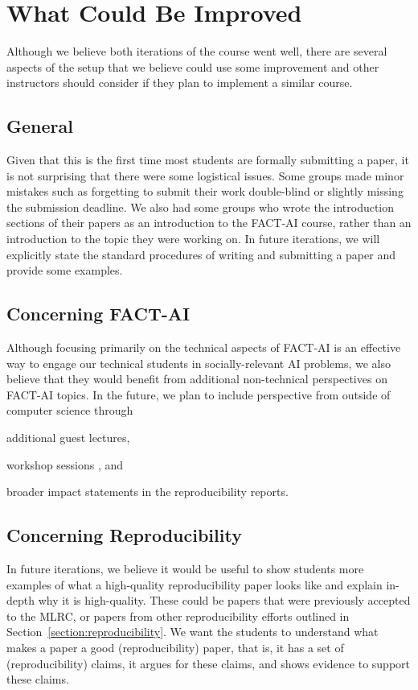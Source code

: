 \documentclass[letterpaper]{article}
\begin{document}
\section{What Could Be Improved}
\label{section:whatdidnt}


Although we believe both iterations of the course went well, there are several aspects of the setup that we believe could use some improvement and other instructors should consider if they plan to implement a similar course.

\subsection{General}

Given that this is the first time most students are formally submitting a paper, it is not surprising that there were some logistical issues.
Some groups made minor mistakes such as forgetting to submit their work double-blind or slightly missing the submission deadline.
We also had some groups who wrote the introduction sections of their papers as an introduction to the FACT-AI course, rather than an introduction to the topic they were working on.
In future iterations, we will explicitly state the standard procedures of writing and submitting a paper and provide some examples.

\subsection{Concerning FACT-AI}
\label{section:non-technical}

Although focusing primarily on the technical aspects of FACT-AI is an effective way to engage our technical students in socially-relevant AI problems, we also believe that they would benefit from additional non-technical perspectives on FACT-AI topics.
In the future, we plan to include perspective from outside of computer science through
\begin{enumerate*}[label=(\roman*)]
\item additional guest lectures,
\item workshop sessions \citep{skirpan2018ethics,shenvalue2021}, and
\item broader impact statements \citep{campbell2021_responsible} in the reproducibility reports.
\end{enumerate*}

\subsection{Concerning Reproducibility}
In future iterations, we believe it would be useful to show students more examples of what a high-quality reproducibility paper looks like and explain in-depth why it is high-quality.
These could be papers that were previously accepted to the MLRC, or papers from other reproducibility efforts outlined in Section~\ref{section:reproducibility}.
We want the students to understand what makes a paper a good (reproducibility) paper, that is, it has a set of (reproducibility) claims, it argues for these claims, and shows evidence to support these claims.
\end{document}
